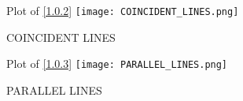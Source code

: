 \documentclass[journal,12pt,twocolumn]{IEEEtran}
\begin{document}
\begin{enumerate}
\begin{figure}[H]
    \label{fig:INTERSECTING LINES.}
\end{figure} 
\begin{figure}[H]
Plot of \eqref{1.0.2}
    \centering
    \texttt{[image: COINCIDENT\_LINES.png]}
    \caption{COINCIDENT LINES}
    \label{fig:COINCIDENT LINES.}
\end{figure} 
\begin{figure}[H]
Plot of \eqref{1.0.3}
    \centering
   \texttt{[image: PARALLEL\_LINES.png]}
    \caption{PARALLEL LINES}
    \label{fig: PARALLEL LINES.}
\end{figure}    
\end{enumerate}
\end{document}
